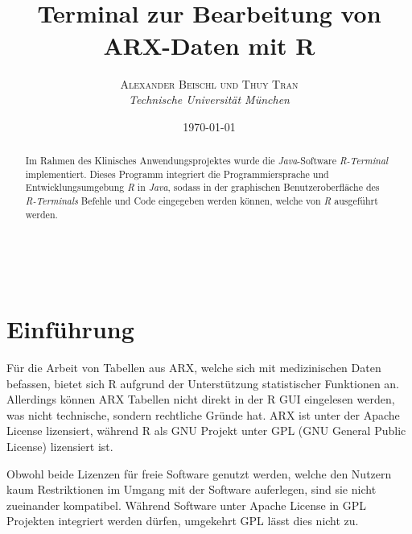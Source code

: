 \documentclass[a4paper, 12pt]{report} %
\title{\textbf{}\\ %
Terminal zur Bearbeitung von ARX-Daten mit R} %
\author{\textsc{Alexander Beischl und Thuy Tran} %
\\{\textit{Technische Universität München}}} %
\date{\today} %
\makeatletter
\renewcommand{\maketitle}{ %
\begin{flushright} %
{\LARGE\@title} %

\vspace{50pt} %

{\large\@author} %
\\\@date %

\vspace{40pt} %
\end{flushright}
}
\makeatother
\begin{document}
\renewcommand\lstlistingname{R-Befehl}

\maketitle %


\renewcommand{\abstractname}{Zusammenfassung} %

\begin{abstract}

Im Rahmen des Klinisches Anwendungsprojektes wurde die \textit{Java}-Software \textit{R-Terminal} implementiert. Dieses Programm integriert die Programmiersprache und Entwicklungsumgebung \textit{R} in \textit{Java}, sodass in der graphischen Benutzeroberfläche des \textit{R-Terminals} Befehle und Code eingegeben werden können, welche von \textit{R} ausgeführt werden. 

\end{abstract}


\vspace{30pt} %

\tableofcontents



\chapter{Einführung}\label{einführung}
Für die Arbeit von Tabellen aus ARX, welche sich mit medizinischen Daten befassen, bietet sich R aufgrund der Unterstützung statistischer Funktionen an. Allerdings können ARX Tabellen nicht direkt in der R GUI eingelesen werden, was nicht technische, sondern rechtliche Gründe hat. ARX ist unter 
der Apache License lizensiert, während R als GNU Projekt unter GPL (GNU General Public License) lizensiert ist. 

Obwohl beide Lizenzen für freie Software genutzt werden, welche den Nutzern kaum Restriktionen im Umgang mit der Software auferlegen, sind sie nicht zueinander kompatibel. Während Software unter Apache License in GPL Projekten integriert werden dürfen, umgekehrt GPL lässt dies nicht zu. 
\end{document}
